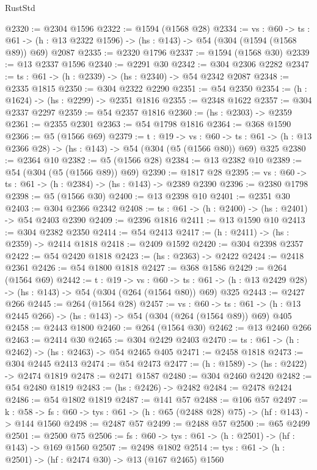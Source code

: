 \begin{lexlean}{RustStd}
\begin{coremodule}
@2320 := @2304 @1596
@2322 := @1594 (@1568 @28)
@2334 := {vs : @60} ->
  {ts : @61} -> (h : @13 @2322 @1596) -> (hs : @143) -> @54 (@304 (@1594 (@1568 @89)) @69) @2087
@2335 := @2320 @1796
@2337 := @1594 (@1568 @30)
@2339 := @13 @2337 @1596
@2340 := @2291 @30
@2342 := @304 @2306 @2282
@2347 := {ts : @61} -> (h : @2339) -> (hs : @2340) -> @54 @2342 @2087
@2348 := @2335 @1815
@2350 := @304 @2322 @2290
@2351 := @54 @2350
@2354 := (h : @1624) -> (hs : @2299) -> @2351 @1816
@2355 := @2348 @1622
@2357 := @304 @2337 @2297
@2359 := @54 @2357 @1816
@2360 := (hs : @2303) -> @2359
@2361 := @2355 @2301
@2363 := @54 @1798 @1816
@2364 := @368 @1590
@2366 := @5 (@1566 @69)
@2379 := {t : @19} ->
  {vs : @60} ->
  {ts : @61} -> (h : @13 @2366 @28) -> (hs : @143) -> @54 (@304 (@5 (@1566 @80)) @69) @325
@2380 := @2364 @10
@2382 := @5 (@1566 @28)
@2384 := @13 @2382 @10
@2389 := @54 (@304 (@5 (@1566 @89)) @69)
@2390 := @1817 @28
@2395 := {vs : @60} -> {ts : @61} -> (h : @2384) -> (hs : @143) -> @2389 @2390
@2396 := @2380 @1798
@2398 := @5 (@1566 @30)
@2400 := @13 @2398 @10
@2401 := @2351 @30
@2403 := @304 @2366 @2342
@2408 := {ts : @61} -> (h : @2400) -> (hs : @2401) -> @54 @2403 @2390
@2409 := @2396 @1816
@2411 := @13 @1590 @10
@2413 := @304 @2382 @2350
@2414 := @54 @2413
@2417 := (h : @2411) -> (hs : @2359) -> @2414 @1818
@2418 := @2409 @1592
@2420 := @304 @2398 @2357
@2422 := @54 @2420 @1818
@2423 := (hs : @2363) -> @2422
@2424 := @2418 @2361
@2426 := @54 @1800 @1818
@2427 := @368 @1586
@2429 := @264 (@1564 @69)
@2442 := {t : @19} ->
  {vs : @60} ->
  {ts : @61} -> (h : @13 @2429 @28) -> (hs : @143) -> @54 (@304 (@264 (@1564 @80)) @69) @325
@2443 := @2427 @266
@2445 := @264 (@1564 @28)
@2457 := {vs : @60} ->
  {ts : @61} -> (h : @13 @2445 @266) -> (hs : @143) -> @54 (@304 (@264 (@1564 @89)) @69) @405
@2458 := @2443 @1800
@2460 := @264 (@1564 @30)
@2462 := @13 @2460 @266
@2463 := @2414 @30
@2465 := @304 @2429 @2403
@2470 := {ts : @61} -> (h : @2462) -> (hs : @2463) -> @54 @2465 @405
@2471 := @2458 @1818
@2473 := @304 @2445 @2413
@2474 := @54 @2473
@2477 := (h : @1589) -> (hs : @2422) -> @2474 @1819
@2478 := @2471 @1587
@2480 := @304 @2460 @2420
@2482 := @54 @2480 @1819
@2483 := (hs : @2426) -> @2482
@2484 := @2478 @2424
@2486 := @54 @1802 @1819
@2487 := @141 @57
@2488 := @106 @57
@2497 := {k : @58} ->
  {fs : @60} -> {tys : @61} -> (h : @65 (@2488 @28) @75) -> (hf : @143) -> @144 @1560
@2498 := @2487 @57
@2499 := @2488 @57
@2500 := @65 @2499
@2501 := @2500 @75
@2506 := {fs : @60} -> {tys : @61} -> (h : @2501) -> (hf : @143) -> @169 @1560
@2507 := @2498 @1802
@2514 := {tys : @61} -> (h : @2501) -> (hf : @2474 @30) -> @13 (@167 @2465) @1560

\end{coremodule}
\end{lexlean}
